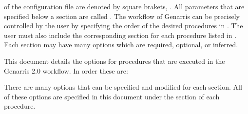 \documentclass[letterpaper,10pt,english]{sphinxmanual}
\begin{document}
 of the configuration file are denoted by square brakets, \sphinxcode{\sphinxupquote{{[}...{]}}}.
All parameters that are specified below a section are called . The
workflow of Genarris can be precisely controlled by the user by specifying the
order of the desired procedures in . The user must also
include the corresponding section for each procedure listed in
. Each section may have many options which are required,
optional, or inferred.

This document details the options for procedures that are executed in the Genarris 2.0
 workflow. In order these are:

\begin{sphinxVerbatim}[commandchars=\\\{\}]
\PYG{p}{[}
 \PYG{p}{]}
\end{sphinxVerbatim}

There are many options that can be specified and modified for each section.
All of these options are specified in this document under the
 section of each procedure.
\end{document}
